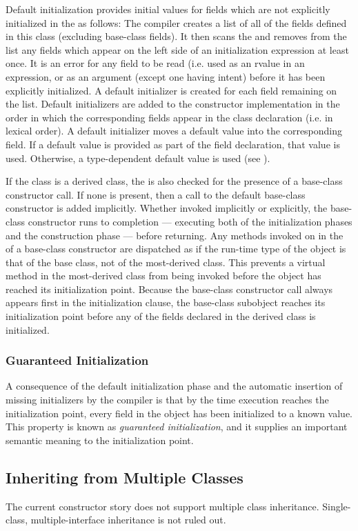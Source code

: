 Default initialization provides initial values for fields which are not
explicitly initialized in the  as follows:  The
compiler creates a list of all of the fields defined in this class (excluding
base-class fields).  It then scans the  and removes
from the list any fields which appear on the left side of an initialization
expression at least once.  It is an error for any field to be read (i.e. used as
an rvalue in an expression, or as an argument (except one having  intent)
before it has been explicitly initialized.  
A default initializer is created for each field remaining on the list.  Default
initializers are added to the constructor implementation in the order in which
the corresponding fields appear in the class declaration (i.e. in lexical
order).  A default initializer moves a default value into the corresponding
field.  If a default value is provided as part of the field declaration, that
value is used.  Otherwise, a type-dependent default value is used
(see ).

If the class is a derived class, the  is also
checked for the presence of a base-class constructor call.  If none is present,
then a call to the default base-class constructor is added implicitly.
Whether invoked implicitly or explicitly, the base-class constructor runs to
completion --- executing both of the initialization phases and the construction
phase --- before returning.  Any methods invoked on  in
the  of a base-class constructor are dispatched as if the
run-time type of the object is that of the base class, not of the most-derived
class.  This prevents a virtual method in the most-derived class from being
invoked before the object has reached its initialization point.  Because the
base-class constructor call always appears first in the initialization clause,
the base-class subobject reaches its initialization point before any of the
fields declared in the derived class is initialized.

\subsubsection{Guaranteed Initialization}
\label{Guaranteed_Initialization}

A consequence of the default initialization phase and the automatic insertion of
missing initializers by the compiler is that by the time execution reaches the
initialization point, every field in the object has been initialized to a known
value.  This property is known as \emph{guaranteed initialization}, and it supplies an
important semantic meaning to the initialization point.

\subsection{Inheriting from Multiple Classes}
\label{Inheriting_from_Multiple_Classes}

The current constructor story does not support multiple class inheritance.
Single-class, multiple-interface inheritance is not ruled out.


